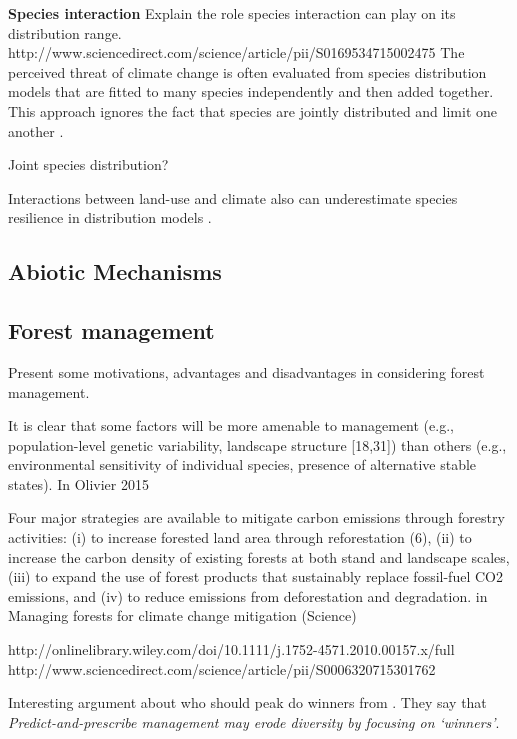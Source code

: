 \textbf{Species interaction}
Explain the role species interaction can play on its distribution range. \\
http://www.sciencedirect.com/science/article/pii/S0169534715002475
The perceived threat of climate change is often evaluated from species distribution models that are fitted to many species independently and then added together. This approach ignores the fact that species are jointly distributed and limit one another \citep{clark2014}.

Joint species distribution?

Interactions between land-use and climate also can underestimate species resilience in distribution models \citep{Goring2017}.

\subsection{Abiotic Mechanisms}

\subsection{Forest management}

Present some motivations, advantages and disadvantages in considering forest management.

It is clear that some factors will be more amenable to management (e.g., population-level genetic variability, landscape structure
[18,31]) than others (e.g., environmental sensitivity of individual species, presence of alternative stable states). In Olivier 2015

Four major strategies are available to mitigate carbon emissions through forestry activities: (i) to increase forested land area through reforestation (6), (ii) to increase the carbon density of existing forests at both stand and landscape scales, (iii) to expand the use of forest products that sustainably replace fossil-fuel CO2 emissions, and (iv) to reduce emissions from deforestation and degradation. in Managing forests for climate change mitigation (Science)

http://onlinelibrary.wiley.com/doi/10.1111/j.1752-4571.2010.00157.x/full \\
http://www.sciencedirect.com/science/article/pii/S0006320715301762

Interesting argument about who should peak do winners from \citet{Webster2017}. They say that \textit{Predict-and-prescribe management may erode diversity by focusing on ‘winners’}.

